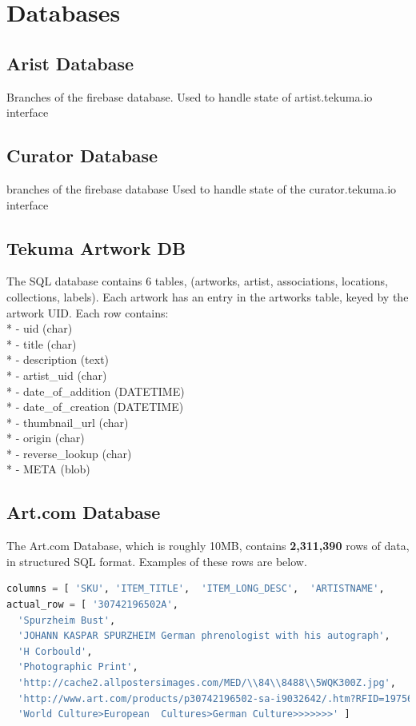 \documentclass[fontsize=12pt]{scrartcl} %
\numberwithin{equation}{section} %
\numberwithin{figure}{section} %
\numberwithin{table}{section} %
\begin{document}
\section{Databases}
\subsection{Arist Database}
Branches of the firebase database.
Used to handle state of artist.tekuma.io interface

\subsection{Curator Database}
branches of the firebase database
Used to handle state of the curator.tekuma.io interface

\subsection{Tekuma Artwork DB}
The SQL database contains 6 tables, (artworks, artist, associations, locations, collections, labels). Each artwork has an entry in the artworks table, keyed by the artwork UID. Each row contains: \\

* - uid (char) \\
* - title (char)\\
* - description (text)\\
* - artist\_uid (char)\\
* - date\_of\_addition (DATETIME)\\
* - date\_of\_creation (DATETIME) \\
* - thumbnail\_url (char) \\
* - origin (char) \\
* - reverse\_lookup (char) \\
* - META (blob) \\

\subsection{Art.com Database}
The Art.com Database, which is roughly 10MB, contains \textbf{2,311,390} rows of data, in structured SQL format. Examples of these rows are below.\\

\begin{lstlisting}[language=Python]
columns = [ 'SKU', 'ITEM_TITLE',  'ITEM_LONG_DESC',  'ARTISTNAME',    'ITEM_TYPE',  'IMAGE_URL',  'PRODUCT_URL', 'PRODUCT_TAXONOMY' ]
actual_row = [ '30742196502A',
  'Spurzheim Bust',
  'JOHANN KASPAR SPURZHEIM German phrenologist with his autograph',
  'H Corbould',
  'Photographic Print',
  'http://cache2.allpostersimages.com/MED/\\84\\8488\\5WQK300Z.jpg',
  'http://www.art.com/products/p30742196502-sa-i9032642/.htm?RFID=197560',
  'World Culture>European  Cultures>German Culture>>>>>>>' ]
\end{lstlisting}
\end{document}
